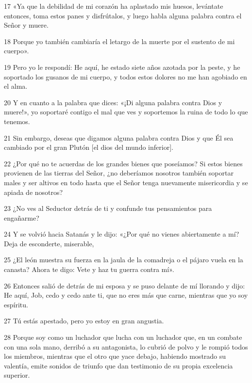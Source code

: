 \par 17 «Ya que la debilidad de mi corazón ha aplastado mis huesos, levántate entonces, toma estos panes y disfrútalos, y luego habla alguna palabra contra el Señor y muere.

\par 18 Porque yo también cambiaría el letargo de la muerte por el sustento de mi cuerpo».

\par 19 Pero yo le respondí: He aquí, he estado siete años azotada por la peste, y he soportado los gusanos de mi cuerpo, y todos estos dolores no me han agobiado en el alma.

\par 20 Y en cuanto a la palabra que dices: «¡Di alguna palabra contra Dios y muere!», yo soportaré contigo el mal que ves y soportemos la ruina de todo lo que tenemos.

\par 21 Sin embargo, deseas que digamos alguna palabra contra Dios y que Él sea cambiado por el gran Plutón [el dios del mundo inferior].

\par 22 ¿Por qué no te acuerdas de los grandes bienes que poseíamos? Si estos bienes provienen de las tierras del Señor, ¿no deberíamos nosotros también soportar males y ser altivos en todo hasta que el Señor tenga nuevamente misericordia y se apiada de nosotros?

\par 23 ¿No ves al Seductor detrás de ti y confunde tus pensamientos para engañarme?

\par 24 Y se volvió hacia Satanás y le dijo: «¿Por qué no vienes abiertamente a mí? Deja de esconderte, miserable,

\par 25 ¿El león muestra su fuerza en la jaula de la comadreja o el pájaro vuela en la canasta? Ahora te digo: Vete y haz tu guerra contra mí».

\par 26 Entonces salió de detrás de mi esposa y se puso delante de mí llorando y dijo: He aquí, Job, cedo y cedo ante ti, que no eres más que carne, mientras que yo soy espíritu.

\par 27 Tú estás apestado, pero yo estoy en gran angustia.

\par 28 Porque soy como un luchador que lucha con un luchador que, en un combate con una sola mano, derribó a su antagonista, lo cubrió de polvo y le rompió todos los miembros, mientras que el otro que yace debajo, habiendo mostrado su valentía, emite sonidos de triunfo que dan testimonio de su propia excelencia superior.

